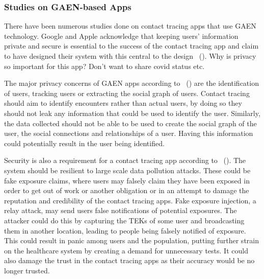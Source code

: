 \subsubsection{Studies on GAEN-based Apps}

There have been numerous studies done on contact tracing apps that use GAEN technology. Google and Apple acknowledge that keeping users' information private and secure is essential to the success of the contact tracing app and claim to have designed their system with this central to the design ~(\cite{12345}).  Why is privacy so important for this app? Don't want to share covid status etc. \newline

The major privacy concerns of GAEN apps according to ~(\cite{9931613}) are the identification of users, tracking users or extracting the social graph of users. Contact tracing should aim to identify encounters rather than actual users, by doing so they should not leak any information that could be used to identify the user. Similarly, the data collected should not be able to be used to create the social graph of the user, the social connections and relationships of a user. Having this information could potentially result in the user being identified. \newline

Security is also a requirement for a contact tracing app according to ~(\cite{9931613}). The system should be resilient to large scale data pollution attacks. These could be fake exposure claims, where users may falsely claim they have been exposed in order to get out of work or another obligation or in an attempt to damage the reputation and credibility of the contact tracing apps. Fake exposure injection, a relay attack, may send users false notifications of potential exposures. The attacker could do this by capturing the TEKs of some user and broadcasting them in another location, leading to people being falsely notified of exposure. This could result in panic among users and the population, putting further strain on the healthcare system by creating a demand for unnecessary tests. It could also damage the trust in the contact tracing apps as their accuracy would be no longer trusted. \newline

